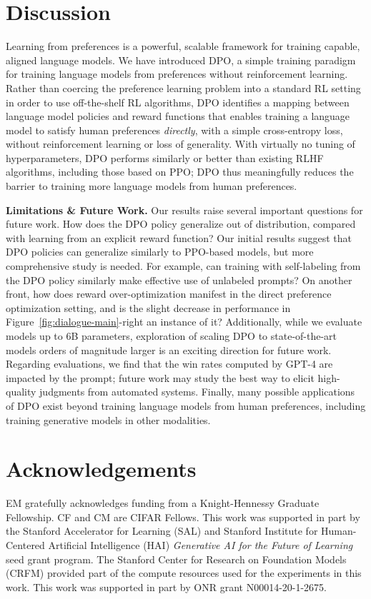 \section{Discussion}
Learning from preferences is a powerful, scalable framework for training capable, aligned language models. We have introduced DPO, a simple training paradigm for training language models from preferences without reinforcement learning. Rather than coercing the preference learning problem into a standard RL setting in order to use off-the-shelf RL algorithms, DPO identifies a mapping between language model policies and reward functions that enables training a language model to satisfy human preferences \textit{directly}, with a simple cross-entropy loss, without reinforcement learning or loss of generality. With virtually no tuning of hyperparameters, DPO performs similarly or better than existing RLHF algorithms, including those based on PPO; DPO thus meaningfully reduces the barrier to training more language models from human preferences.

\textbf{Limitations \& Future Work.} Our results raise several important questions for future work. How does the DPO policy generalize out of distribution, compared with learning from an explicit reward function? Our initial results suggest that DPO policies can generalize similarly to PPO-based models, but more comprehensive study is needed. For example, can training with self-labeling from the DPO policy similarly make effective use of unlabeled prompts? On another front, how does reward over-optimization manifest in the direct preference optimization setting, and is the slight decrease in performance in Figure~\ref{fig:dialogue-main}-right an instance of it? Additionally, while we evaluate models up to 6B parameters, exploration of scaling DPO to state-of-the-art models orders of magnitude larger is an exciting direction for future work. Regarding evaluations, we find that the win rates computed by GPT-4 are impacted by the prompt; future work may study the best way to elicit high-quality judgments from automated systems. Finally, many possible applications of DPO exist beyond training language models from human preferences, including training generative models in other modalities.

\section*{Acknowledgements}
EM gratefully acknowledges funding from a Knight-Hennessy Graduate Fellowship. CF and CM are CIFAR Fellows. This work was supported in part by the Stanford Accelerator for Learning (SAL) and Stanford Institute for Human-Centered Artificial Intelligence (HAI) \textit{Generative AI for the Future of Learning} seed grant program. The Stanford Center for Research on Foundation Models (CRFM) provided part of the compute resources used for the experiments in this work. This work was supported in part by ONR grant N00014-20-1-2675.

\newpage

